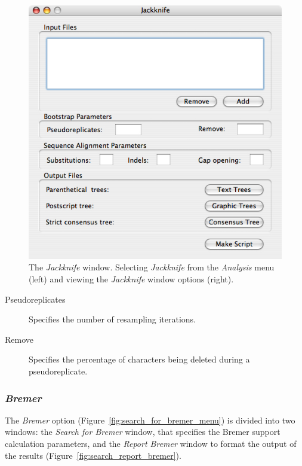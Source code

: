 {\begin{figure}
\begin{minipage}[c]{0.52\textwidth}
	   	\includegraphics[width=\textwidth]{doc/figures/jackknife_window.jpg}
   	\end{minipage}
\caption{The \emph{Jackknife} window. Selecting \emph{Jackknife} from the \emph{Analysis} menu (left) and viewing the \emph{Jackknife} window options (right).}
\label{fig:jackknife}
\end{figure}

\begin{description}
    \item[Pseudoreplicates] Specifies the number of resampling iterations.
    \item[Remove] Specifies the percentage of characters being deleted during a pseudoreplicate.
\end{description}

\subsubsection*{\emph{Bremer}}

The \emph{Bremer} option (Figure~\ref{fig:search_for_bremer_menu}) is divided into two windows: the \emph{Search for Bremer} window, that specifies the Bremer support \cite{Bremer1988, Kallersjoetal1992} calculation parameters, and the \emph{Report Bremer} window to format the output of the results (Figure~\ref{fig:search_report_bremer}). 

}
